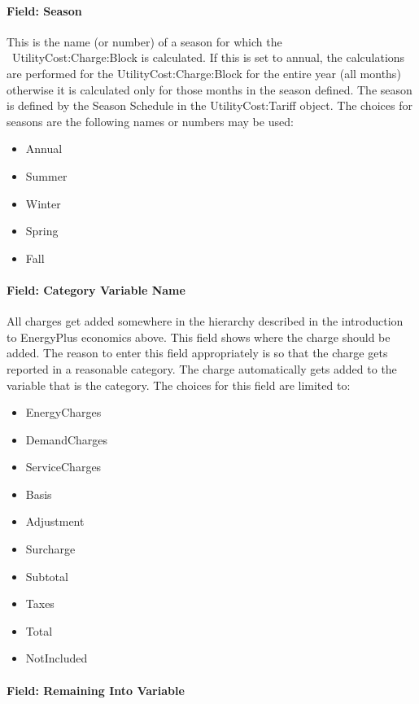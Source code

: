 \paragraph{Field: Season}\label{field-season}

This is the name (or number) of a season for which the ~UtilityCost:Charge:Block is calculated. If this is set to annual, the calculations are performed for the UtilityCost:Charge:Block for the entire year (all months) otherwise it is calculated only for those months in the season defined. The season is defined by the Season Schedule in the UtilityCost:Tariff object. The choices for seasons are the following names or numbers may be used:

\begin{itemize}
\item
  Annual
\item
  Summer
\item
  Winter
\item
  Spring
\item
  Fall
\end{itemize}

\paragraph{Field: Category Variable Name}\label{field-category-variable-name}

All charges get added somewhere in the hierarchy described in the introduction to EnergyPlus economics above. This field shows where the charge should be added. The reason to enter this field appropriately is so that the charge gets reported in a reasonable category. The charge automatically gets added to the variable that is the category. The choices for this field are limited to:

\begin{itemize}
\item
  EnergyCharges
\item
  DemandCharges
\item
  ServiceCharges
\item
  Basis
\item
  Adjustment
\item
  Surcharge
\item
  Subtotal
\item
  Taxes
\item
  Total
\item
  NotIncluded
\end{itemize}

\paragraph{Field: Remaining Into Variable}\label{field-remaining-into-variable}

